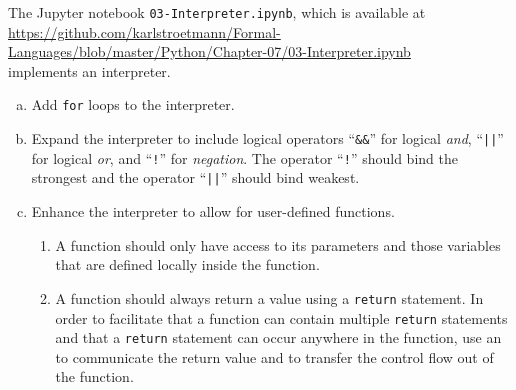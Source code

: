 \noindent
The Jupyter notebook \texttt{03-Interpreter.ipynb}, which is available at
\\[0.2cm]
\hspace*{0.3cm}
\href{https://github.com/karlstroetmann/Formal-Languages/blob/master/Python/Chapter-07/03-Interpreter.ipynb}{https://github.com/karlstroetmann/Formal-Languages/blob/master/Python/Chapter-07/03-Interpreter.ipynb}
\\[0.2cm]
implements an interpreter.

\exerciseEng
\begin{enumerate}[(a)]
\item Add \texttt{for} loops to the interpreter.
\item Expand the interpreter to include logical operators
      ``\texttt{\&\&}'' for logical \emph{and}, ``\texttt{||}'' for logical \emph{or},
      and ``\texttt{!}'' for \emph{negation}. The operator ``\texttt{!}'' should bind the
      strongest and the operator ``\texttt{||}'' should bind weakest.
\item Enhance the interpreter to allow for user-defined functions.
      \begin{enumerate}
      \item A function should only have access to its parameters and those variables that
            are defined locally inside the function.  
      \item A function should always return a value using a \texttt{return} statement.
            In order to facilitate that a function can contain multiple \texttt{return}
            statements and that a \texttt{return} statement can occur
            anywhere in the function,  use an  to communicate the
            return value and to transfer the control flow out of the function.
      \end{enumerate}
\end{enumerate}



